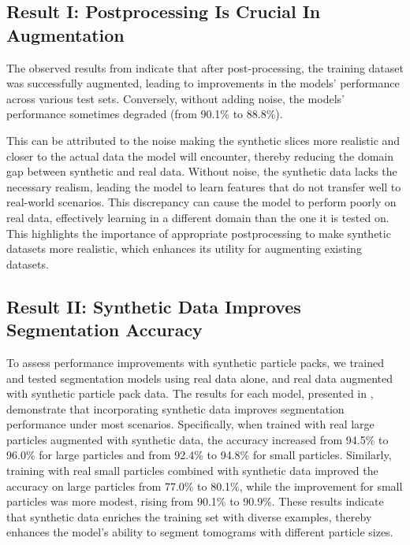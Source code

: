 \documentclass[preprint,12pt]{elsarticle}
\begin{document}
\subsection{Result I: Postprocessing Is Crucial In Augmentation}
The observed results from  indicate that after post-processing, the training dataset was successfully augmented, leading to improvements in the models' performance across various test sets. 
Conversely, without adding noise, the models' performance sometimes degraded (from 90.1\% to 88.8\%).
\par
This can be attributed to the noise making the synthetic slices more realistic and closer to the actual data the model will encounter, thereby reducing the domain gap between synthetic and real data.
Without noise, the synthetic data lacks the necessary realism, leading the model to learn features that do not transfer well to real-world scenarios.
This discrepancy can cause the model to perform poorly on real data, effectively learning in a different domain than the one it is tested on. This highlights the importance of appropriate postprocessing to make synthetic datasets more realistic, which enhances its utility for augmenting existing datasets.
\subsection{Result II: Synthetic Data Improves Segmentation Accuracy}
To assess performance improvements with synthetic particle packs, we trained and tested segmentation models using real data alone, and real data augmented with synthetic particle pack data. 
The results for each model, presented in , demonstrate that incorporating synthetic data improves segmentation performance under most scenarios.
Specifically, when trained with real large particles augmented with synthetic data, the accuracy increased from 94.5\% to 96.0\% for large particles and from 92.4\% to 94.8\% for small particles. 
Similarly, training with real small particles combined with synthetic data improved the accuracy on large particles from 77.0\% to 80.1\%, while the improvement for small particles was more modest, rising from 90.1\% to 90.9\%. 
These results indicate that synthetic data enriches the training set with diverse examples, thereby enhances the model's ability to segment tomograms with different particle sizes. 
\end{document}
